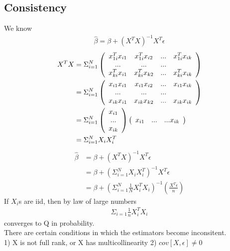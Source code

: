 \documentclass[a4paper]{article}
\begin{document}
\subsection{Consistency}
We know
\begin{align*}
\hat \beta = \beta + (X^TX)^{-1}X^T\epsilon
\end{align*}
\begin{align*}
X^TX & = \Sigma_{i=1}^N
 \left( \begin{array} { c  c  c c } 
                   x_{1i}^Tx_{i1} & x_{1i}^Tx_{i2} & ... & x^T_{1i}x_{ik}   \\
                   ... & ... & ... & \\
                   x_{ki}^Tx_{i1} & x_{ki}^Tx_{k2} & ... & x^T_{ki}x_{ik}   \\
           \end{array} \right) \\
    & =  \Sigma_{i=1}^N
 \left( \begin{array} { c  c  c c } 
                   x_{i1}x_{i1} & x_{i1}x_{i2} & ... & x_{i1}x_{ik}   \\
                   ... & ... & ... & \\
                   x_{ik}x_{i1} & x_{ik}x_{k2} & ... & x_{ik}x_{ik}   \\
           \end{array} \right) \\
      &  =  \Sigma_{i=1}^N
 \left( \begin{array} { c  } 
                   x_{i1}    \\
                   ...  \\
                   x_{ik}    \\
           \end{array} \right)
 \left( \begin{array} { c c c c } 
                   x_{i1}  & ... &  ... x_{ik}\\ 
           \end{array} \right) \\
     & = \Sigma_{i=1}^N X_i X_i^T
\end{align*}
\begin{align*}
\hat \beta &= \beta + ({X^TX})^{-1} {X^T \epsilon} \\
               &= \beta + ( \Sigma_{i=1}^N X_i X_i^T)^{-1} X^T \epsilon \\
               &= \beta + ( \Sigma_{i=1}^N  \frac{1}{N}{X_i^TX_i})^{-1}(\frac{X^T \epsilon}{n})
\end{align*}
If $X_i$s are iid, then by law of large numbers
\begin{align*}
\Sigma_{i=1}  \frac{1}{n}{X_i^TX_i} 
\end{align*}
converges to Q in probability.\\
There are certain conditions in which the estimators become inconsitent.\\
1) X is not full rank, or X has multicollinearity
2) $cov[X, \epsilon] \neq 0$
\end{document}

